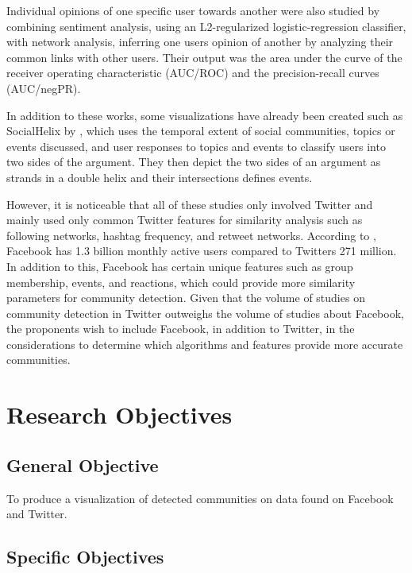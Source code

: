 Individual opinions of one specific user towards another were also studied by  combining sentiment analysis, using an L2-regularized logistic-regression classifier, with network analysis, inferring one user\vtick s opinion of another by analyzing their common links with other users. Their output was the area under the curve of the receiver operating characteristic (AUC/ROC) and the precision-recall curves (AUC/negPR). 

In addition to these works, some visualizations have already been created such as SocialHelix by , which uses the temporal extent of social communities, topics or events discussed, and user responses to topics and events to classify users into two sides of the argument. They then depict the two sides of an argument as strands in a double helix and their intersections defines events.

However, it is noticeable that all of these studies only involved Twitter and mainly used only common Twitter features for similarity analysis such as following networks, hashtag frequency, and retweet networks. According to , Facebook has 1.3 billion monthly active users compared to Twitter\vtick s 271 million. In addition to this, Facebook has certain unique features such as group membership, events, and reactions, which could provide more similarity parameters for community detection. Given that the volume of studies on community detection in Twitter outweighs the volume of studies about Facebook, the proponents wish to include Facebook, in addition to Twitter, in the considerations to determine which algorithms and features provide more accurate communities.

\section{Research Objectives}
\label{sec:researchobjectives}

\subsection{General Objective}
\label{sec:generalobjective}

To produce a visualization of detected communities on data found on Facebook and Twitter.

\subsection{Specific Objectives}
\label{sec:specificobjectives}

